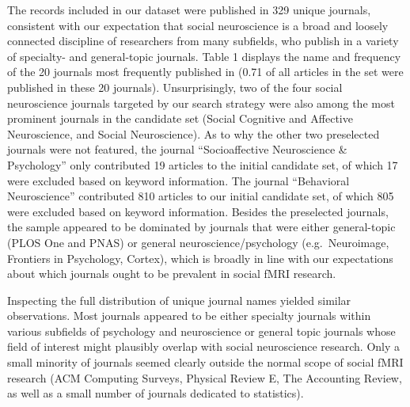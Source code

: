 \documentclass[
  english,
  man,floatsintext]{apa6}
\begin{document}
The records included in our dataset were published in 329 unique journals, consistent with our expectation that social neuroscience is a broad and loosely connected discipline of researchers from many subfields, who publish in a variety of specialty- and general-topic journals. Table 1 displays the name and frequency of the 20 journals most frequently published in (0.71 of all articles in the set were published in these 20 journals). Unsurprisingly, two of the four social neuroscience journals targeted by our search strategy were also among the most prominent journals in the candidate set (Social Cognitive and Affective Neuroscience, and Social Neuroscience). As to why the other two preselected journals were not featured, the journal ``Socioaffective Neuroscience \& Psychology'' only contributed 19 articles to the initial candidate set, of which 17 were excluded based on keyword information. The journal ``Behavioral Neuroscience'' contributed 810 articles to our initial candidate set, of which 805 were excluded based on keyword information. Besides the preselected journals, the sample appeared to be dominated by journals that were either general-topic (PLOS One and PNAS) or general neuroscience/psychology (e.g.~Neuroimage, Frontiers in Psychology, Cortex), which is broadly in line with our expectations about which journals ought to be prevalent in social fMRI research.

Inspecting the full distribution of unique journal names yielded similar observations. Most journals appeared to be either specialty journals within various subfields of psychology and neuroscience or general topic journals whose field of interest might plausibly overlap with social neuroscience research. Only a small minority of journals seemed clearly outside the normal scope of social fMRI research (ACM Computing Surveys, Physical Review E, The Accounting Review, as well as a small number of journals dedicated to statistics).
\end{document}
